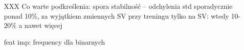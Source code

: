 XXX Co warte podkreślenia: spora stabilność -- odchylenia std sporadycznie ponad 10\%, za wyjątkiem zmiennych SV przy treningu tylko na SV: wtedy 10-20\% a nawet więcej

feat imp: frequency dla binarnych

%






%
%
%

